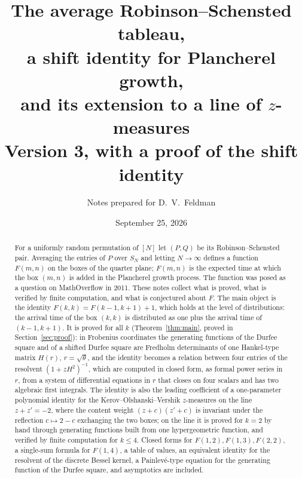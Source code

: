 \documentclass[11pt]{article}
\title{The average Robinson--Schensted tableau,\\ a shift identity for Plancherel growth,\\ and its extension to a line of $z$-measures\\[4pt] \large Version 3, with a proof of the shift identity}
\author{Notes prepared for D.~V.~Feldman}
\date{September 25, 2026}
\theoremstyle{definition}
\theoremstyle{remark}
\begin{document}
\maketitle

\begin{abstract}
For a uniformly random permutation of $[N]$ let $(P,Q)$ be its Robinson--Schensted pair. Averaging the entries of $P$ over $S_N$ and letting $N\to\infty$ defines a function $F(m,n)$ on the boxes of the quarter plane; $F(m,n)$ is the expected time at which the box $(m,n)$ is added in the Plancherel growth process. The function was posed as a question on MathOverflow in 2011. These notes collect what is proved, what is verified by finite computation, and what is conjectured about $F$. The main object is the identity $F(k,k)=F(k-1,k+1)+1$, which holds at the level of distributions: the arrival time of the box $(k,k)$ is distributed as one plus the arrival time of $(k-1,k+1)$. It is proved for all $k$ (Theorem~\ref{thm:main}, proved in Section~\ref{sec:proof}): in Frobenius coordinates the generating functions of the Durfee square and of a shifted Durfee square are Fredholm determinants of one Hankel-type matrix $H(r)$, $r=\sqrt\theta$, and the identity becomes a relation between four entries of the resolvent $(1+zH^2)^{-1}$, which are computed in closed form, as formal power series in $r$, from a system of differential equations in $r$ that closes on four scalars and has two algebraic first integrals. The identity is also the leading coefficient of a one-parameter polynomial identity for the Kerov--Olshanski--Vershik $z$-measures on the line $z+z'=-2$, where the content weight $(z+c)(z'+c)$ is invariant under the reflection $c\mapsto2-c$ exchanging the two boxes; on the line it is proved for $k=2$ by hand through generating functions built from one hypergeometric function, and verified by finite computation for $k\le4$. Closed forms for $F(1,2),F(1,3),F(2,2)$, a single-sum formula for $F(1,4)$, a table of values, an equivalent identity for the resolvent of the discrete Bessel kernel, a Painlev\'e-type equation for the generating function of the Durfee square, and asymptotics are included.
\end{abstract}

\tableofcontents
\end{document}
